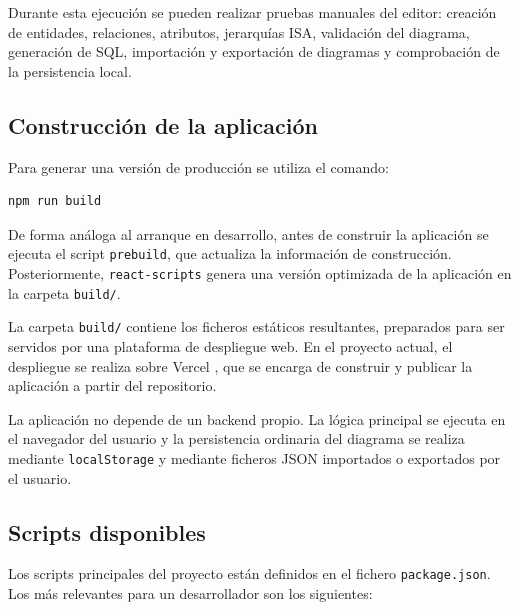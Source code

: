 Durante esta ejecución se pueden realizar pruebas manuales del editor: creación de entidades, relaciones, atributos, jerarquías ISA, validación del diagrama, generación de SQL, importación y exportación de diagramas y comprobación de la persistencia local.

\subsection{Construcción de la aplicación}

Para generar una versión de producción se utiliza el comando:

\begin{verbatim}
npm run build
\end{verbatim}

De forma análoga al arranque en desarrollo, antes de construir la aplicación se ejecuta el script \texttt{prebuild}, que actualiza la información de construcción. Posteriormente, \texttt{react-scripts} genera una versión optimizada de la aplicación en la carpeta \texttt{build/}.

La carpeta \texttt{build/} contiene los ficheros estáticos resultantes, preparados para ser servidos por una plataforma de despliegue web. En el proyecto actual, el despliegue se realiza sobre Vercel \cite{vercel}, que se encarga de construir y publicar la aplicación a partir del repositorio.

La aplicación no depende de un backend propio. La lógica principal se ejecuta en el navegador del usuario y la persistencia ordinaria del diagrama se realiza mediante \texttt{localStorage} y mediante ficheros JSON importados o exportados por el usuario.

\subsection{Scripts disponibles}

Los scripts principales del proyecto están definidos en el fichero \texttt{package.json}. Los más relevantes para un desarrollador son los siguientes:

